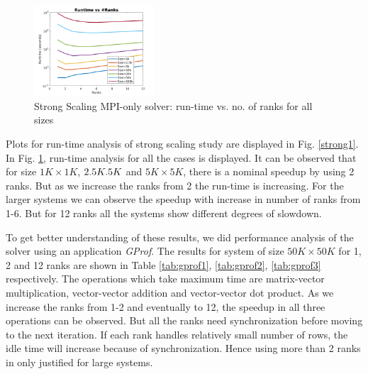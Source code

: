 \documentclass[sigplan,screen]{acmart}
\begin{document}
\begin{figure}[h!]
	\begin{center}
		\includegraphics[width=0.4\textwidth]{MPI_strong_allranks_log.png}
	\end{center}
	\caption{Strong Scaling MPI-only solver: run-time vs. no. of ranks for all sizes}
	\label{strong2}      
\end{figure}

Plots for run-time analysis of strong scaling study are displayed in Fig. \ref{strong1}. In Fig. \ref{strong2}, run-time analysis for all the cases is displayed. It can be observed that for size $1K\times 1K$, $2.5K\time 2.5K$ and $5K\times 5K$, there is a nominal speedup by using 2 ranks. But as we increase the ranks from 2 the run-time is increasing. For the larger systems we can observe the speedup with increase in number of ranks from 1-6. But for 12 ranks all the systems show different degrees of slowdown. 

To get better understanding of these results, we did performance analysis of the solver using an application \emph{GProf}. The results for system of size $50K\times 50K$ for 1, 2 and 12 ranks are shown in Table \ref{tab:gprof1}, \ref{tab:gprof2}, \ref{tab:gprof3} respectively. The operations which take maximum time are matrix-vector multiplication, vector-vector addition and vector-vector dot product. As we increase the ranks from 1-2 and eventually to 12, the speedup in all three operations can be observed. But all the ranks need synchronization before moving to the next iteration. If each rank handles relatively small number of rows, the idle time will increase because of synchronization. Hence using more than 2 ranks in only justified for large systems. 
\end{document}
